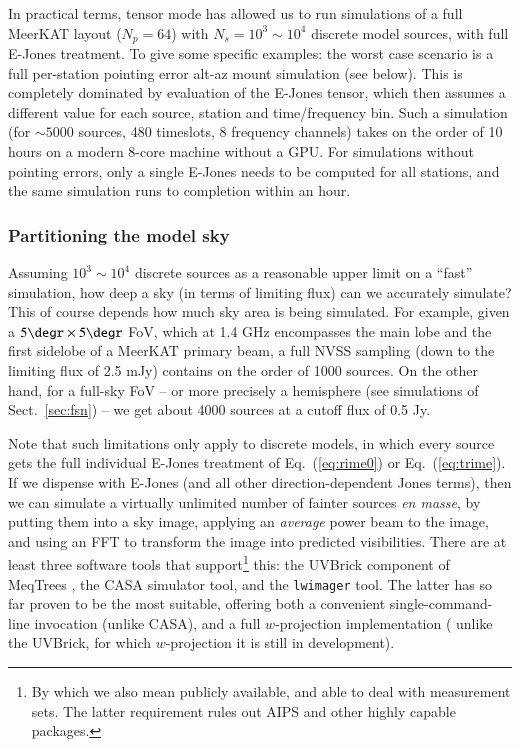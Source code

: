 \documentclass{aa}
\begin{document}
In practical terms, tensor mode has allowed us to run simulations of a full MeerKAT layout ($N_p=64$) 
with $N_s=10^3\sim10^4$ discrete model sources, with full E-Jones treatment. To give some specific examples: the worst case scenario is a full per-station pointing error alt-az mount simulation (see below). This is completely dominated by evaluation of the E-Jones tensor, which then assumes a different value for each source, station and time/frequency bin. Such a simulation (for $\sim5000$ sources, 480 timeslots, 8 frequency channels) takes on the order of 10 hours on a modern 8-core machine without a GPU. For simulations without pointing errors, only a single E-Jones needs to be computed for all stations, and the same simulation runs to completion within an hour.


\subsubsection{Partitioning the model sky}

Assuming $10^3\sim10^4$ discrete sources as a reasonable upper limit on a ``fast'' simulation, how deep a sky (in terms of limiting flux) can we accurately simulate? This of course depends how much sky area is being simulated. For example, given a $5\degr\times5\degr$ FoV, which at 1.4 GHz encompasses the main lobe and the first sidelobe of a MeerKAT primary beam, a full NVSS sampling (down to the limiting flux of 2.5 mJy) contains on the order of 1000 sources. On the other hand, for a full-sky FoV -- or more precisely a hemisphere (see simulations of Sect.~\ref{sec:fsn}) -- we get about 4000 sources at a cutoff flux of 0.5 Jy. 

Note that such limitations only apply to discrete models, in which every source gets the full individual E-Jones treatment of Eq.~(\ref{eq:rime0}) or Eq.~(\ref{eq:trime}). If we dispense with E-Jones (and all other direction-dependent Jones terms), then we can simulate a virtually unlimited number of fainter sources \emph{en masse}, by putting them into a sky image, applying an \emph{average} power beam to the image, and using an FFT to transform the image into predicted visibilities. There are at least three software tools that support\footnote{By which we also mean publicly available, and able to deal with measurement sets. The latter requirement rules out AIPS and other highly capable packages.}  this: the UVBrick component of MeqTrees \citep{Abdalla:uvbrick}, the CASA simulator tool, and the {\tt lwimager} tool. The latter has so far proven to be the most suitable, offering both a convenient single-command-line invocation (unlike CASA), and a full $w$-projection \citep{Cornwell:wproj} implementation (
unlike the UVBrick, for which $w$-projection it is still in development). 
\end{document}
